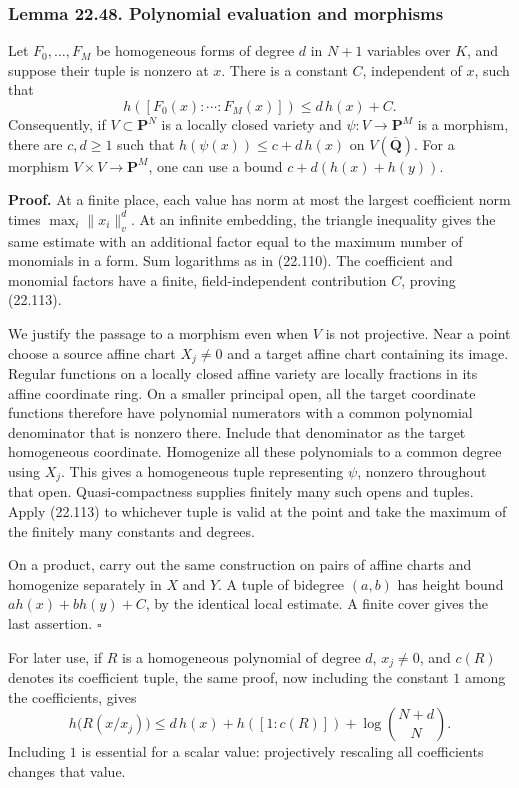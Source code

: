 \documentclass[
  11pt,
  a4paper,
]{article}
\begin{document}
\subsubsection{Lemma 22.48. Polynomial evaluation and
morphisms}\label{lemma-22.48.-polynomial-evaluation-and-morphisms}

Let \(F_0,\ldots,F_M\) be homogeneous forms of degree \(d\) in \(N+1\)
variables over \(K\), and suppose their tuple is nonzero at \(x\). There
is a constant \(C\), independent of \(x\), such that \[
 h([F_0(x):\cdots:F_M(x)])\le d\,h(x)+C.
 \tag{22.113}
\] Consequently, if \(V\subset\mathbf P^N\) is a locally closed variety
and \(\psi:V\to\mathbf P^M\) is a morphism, there are \(c,d\ge1\) such
that \(h(\psi(x))\le c+d\,h(x)\) on \(V(\overline{\mathbf Q})\). For a
morphism \(V\times V\to\mathbf P^M\), one can use a bound
\(c+d(h(x)+h(y))\).

\textbf{Proof.} At a finite place, each value has norm at most the
largest coefficient norm times \(\max_i\|x_i\|_v^d\). At an infinite
embedding, the triangle inequality gives the same estimate with an
additional factor equal to the maximum number of monomials in a form.
Sum logarithms as in (22.110). The coefficient and monomial factors have
a finite, field-independent contribution \(C\), proving (22.113).

We justify the passage to a morphism even when \(V\) is not projective.
Near a point choose a source affine chart \(X_j\ne0\) and a target
affine chart containing its image. Regular functions on a locally closed
affine variety are locally fractions in its affine coordinate ring. On a
smaller principal open, all the target coordinate functions therefore
have polynomial numerators with a common polynomial denominator that is
nonzero there. Include that denominator as the target homogeneous
coordinate. Homogenize all these polynomials to a common degree using
\(X_j\). This gives a homogeneous tuple representing \(\psi\), nonzero
throughout that open. Quasi-compactness supplies finitely many such
opens and tuples. Apply (22.113) to whichever tuple is valid at the
point and take the maximum of the finitely many constants and degrees.

On a product, carry out the same construction on pairs of affine charts
and homogenize separately in \(X\) and \(Y\). A tuple of bidegree
\((a,b)\) has height bound \(a h(x)+b h(y)+C\), by the identical local
estimate. A finite cover gives the last assertion. \(\square\)

For later use, if \(R\) is a homogeneous polynomial of degree \(d\),
\(x_j\ne0\), and \(c(R)\) denotes its coefficient tuple, the same proof,
now including the constant \(1\) among the coefficients, gives \[
 h\bigl(R(x/x_j)\bigr)
 \le d\,h(x)+h([1:c(R)])+\log\binom{N+d}{N}.
 \tag{22.114}
\] Including \(1\) is essential for a scalar value: projectively
rescaling all coefficients changes that value.
\end{document}
